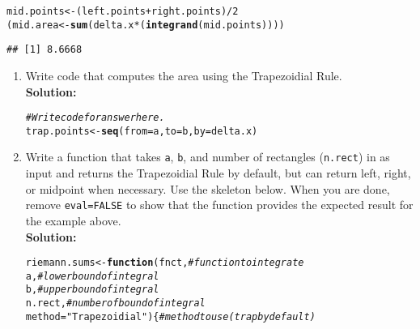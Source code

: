 \documentclass{article}\usepackage[]{graphicx}\usepackage[]{xcolor}
\makeatletter
\newcommand{\hlnum}[1]{\textcolor[rgb]{0.686,0.059,0.569}{#1}}%
\newcommand{\hlsng}[1]{\textcolor[rgb]{0.192,0.494,0.8}{#1}}%
\newcommand{\hlcom}[1]{\textcolor[rgb]{0.678,0.584,0.686}{\textit{#1}}}%
\newcommand{\hlopt}[1]{\textcolor[rgb]{0,0,0}{#1}}%
\newcommand{\hldef}[1]{\textcolor[rgb]{0.345,0.345,0.345}{#1}}%
\newcommand{\hlkwa}[1]{\textcolor[rgb]{0.161,0.373,0.58}{\textbf{#1}}}%
\newcommand{\hlkwb}[1]{\textcolor[rgb]{0.69,0.353,0.396}{#1}}%
\newcommand{\hlkwc}[1]{\textcolor[rgb]{0.333,0.667,0.333}{#1}}%
\newcommand{\hlkwd}[1]{\textcolor[rgb]{0.737,0.353,0.396}{\textbf{#1}}}%
\newenvironment{kframe}{%
 \def\at@end@of@kframe{}%
 \ifinner\ifhmode%
  \def\at@end@of@kframe{\end{minipage}}%
  \begin{minipage}{\columnwidth}%
 \fi\fi%
 \def\FrameCommand##1{\hskip\@totalleftmargin \hskip-\fboxsep
 \colorbox{shadecolor}{##1}\hskip-\fboxsep
     \hskip-\linewidth \hskip-\@totalleftmargin \hskip\columnwidth}%
 \MakeFramed {\advance\hsize-\width
   \@totalleftmargin\z@ \linewidth\hsize
   \@setminipage}}%
 {\par\unskip\endMakeFramed%
 \at@end@of@kframe}
\newenvironment{knitrout}{}{} %
\makeatother
\begin{document}
\begin{enumerate}
\begin{knitrout}
\begin{kframe}
\begin{alltt}
\hldef{mid.points} \hlkwb{<-} \hldef{(left.points}\hlopt{+}\hldef{right.points)}\hlopt{/}\hlnum{2}
\hldef{(mid.area} \hlkwb{<-} \hlkwd{sum}\hldef{(delta.x}\hlopt{*}\hldef{(}\hlkwd{integrand}\hldef{(mid.points))))}
\end{alltt}
\begin{verbatim}
## [1] 8.6668
\end{verbatim}
\end{kframe}
\end{knitrout}
\newpage
\begin{enumerate}
  \item Write code that computes the area using the Trapezoidial Rule.\\
  \textbf{Solution:}
\begin{knitrout}\scriptsize
{}\color{fgcolor}\begin{kframe}
\begin{alltt}
\hlcom{# Write code for answer here.}
\hldef{trap.points} \hlkwb{<-} \hlkwd{seq}\hldef{(}\hlkwc{from} \hldef{= a,} \hlkwc{to} \hldef{= b,} \hlkwc{by}\hldef{=delta.x)}
\end{alltt}
\end{kframe}
\end{knitrout}
  \item Write a function that takes \texttt{a}, \texttt{b}, and number of 
  rectangles (\texttt{n.rect}) in as input and returns the Trapezoidial Rule 
  by default, but can return left, right, or midpoint when necessary. Use the
  skeleton below. When you are done, remove \texttt{eval=FALSE} to show that
  the function provides the expected result for the example above.\\
  \textbf{Solution:}
\begin{knitrout}\scriptsize
{}\color{fgcolor}\begin{kframe}
\begin{alltt}
\hldef{riemann.sums} \hlkwb{<-} \hlkwa{function}\hldef{(}\hlkwc{fnct}\hldef{,}                        \hlcom{# function to integrate}
                         \hlkwc{a}\hldef{,}                           \hlcom{# lower bound of integral}
                         \hlkwc{b}\hldef{,}                           \hlcom{# upper bound of integral}
                         \hlkwc{n.rect}\hldef{,}                      \hlcom{# number of  bound of integral}
                         \hlkwc{method} \hldef{=} \hlsng{"Trapezoidial"}\hldef{)\{}    \hlcom{# method to use (trap by default)}

\end{alltt}
\end{kframe}
\end{knitrout}
\end{enumerate}
\end{enumerate}
\end{document}
